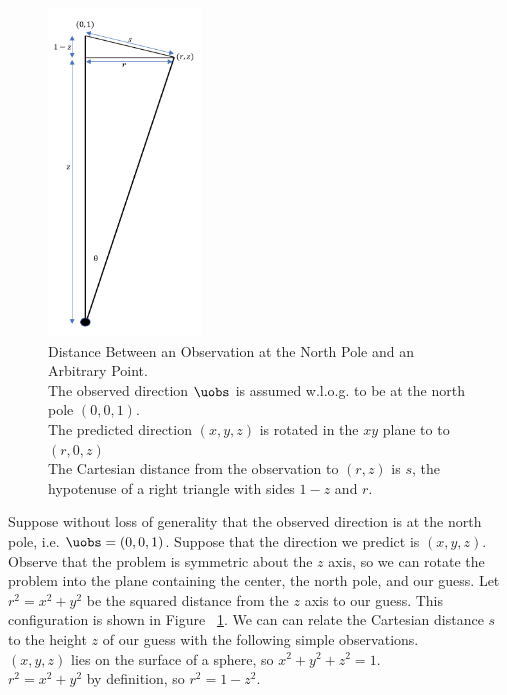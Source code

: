 \begin{figure}[hbt!]
\begin{center}
\includegraphics[width=0.36\textwidth]{../figs/misc/orange_slice.png}
\end{center}
\caption[Distance Between an Observation at the North Pole and an Arbitrary Point]
{Distance Between an Observation at the North Pole and an Arbitrary Point.\\
The observed direction $\uobs$ is assumed w.l.o.g. to be at the north pole $(0, 0, 1)$.\\
The predicted direction $(x,y,z)$ is rotated in the $xy$ plane to to $(r, 0, z)$ \\
The Cartesian distance from the observation to $(r,z)$ is $s$, the hypotenuse of a right triangle with sides $1-z$ and $r$.}
\label{fig:OrangeSlice}
\end{figure}
Suppose without loss of generality that the observed direction is at the north pole, i.e. $\uobs = (0, 0, 1)$.
Suppose that the direction we predict is $(x, y, z)$.
Observe that the problem is symmetric about the $z$ axis, so we can rotate the problem into 
the plane containing the center, the north pole, and our guess.
Let $r^2 = x^2 + y^2$ be the squared distance from the $z$ axis to our guess.
This configuration is shown in Figure ~\ref{fig:OrangeSlice}.
We can can relate the Cartesian distance $s$ to the height $z$ of our guess with the following simple observations.\\
$(x, y, z)$ lies on the surface of a sphere, so $x^2 + y^2 + z^2 = 1$.\\
$r^2 = x^2 + y^2$ by definition, so $r^2 = 1 - z^2$.\\

